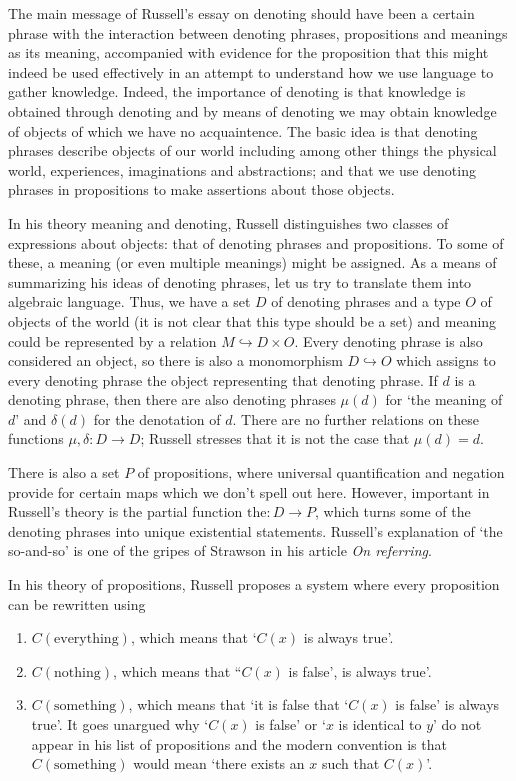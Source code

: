 \documentclass{article}
\begin{document}
\maketitle

The main message of Russell's essay on denoting should have been a certain
phrase with the interaction between denoting phrases, propositions and meanings
as its meaning, accompanied with evidence for the proposition that this might
indeed be used effectively in an attempt to understand how we use language to 
gather knowledge. Indeed, the importance of denoting is that knowledge
is obtained through denoting and by means of denoting we may obtain knowledge
of objects of which we have no acquaintence. The basic idea is that denoting
phrases describe objects of our world including among other things the physical 
world, experiences, imaginations and abstractions; and that we use denoting 
phrases in propositions to make assertions about those objects.

In his theory meaning and denoting, Russell distinguishes two classes of
expressions about objects: that of denoting phrases and
propositions. To some of these, a meaning (or even multiple meanings) might be
assigned. As a means of summarizing his ideas of denoting phrases, let us try
to translate them into algebraic language. Thus, we have a set $D$ of denoting
phrases and a type $O$ of objects of the world (it is not clear that this type
should be a set) and meaning could be represented by a relation 
$M\hookrightarrow D\times O$. Every denoting phrase is also considered an
object, so there is also a monomorphism $D \hookrightarrow O$ which assigns to
every denoting phrase the object representing that denoting phrase. If $d$ is
a denoting phrase, then there are also denoting phrases $\mu(d)$ for `the meaning
of $d$' and $\delta(d)$ for the denotation of $d$. There are no further relations
on these functions $\mu,\delta:D\to D$; Russell stresses that it is not the case
that $\mu(d)=d$.

There is also a set $P$ of propositions, where universal quantification and negation
provide for certain maps which we don't spell out here. However, important in
Russell's theory is the partial function $\text{the}:D\to P$, which turns some
of the denoting phrases into unique existential statements. Russell's explanation
of `the so-and-so' is one of the gripes of Strawson in his article \emph{On 
referring}.

In his theory of propositions, Russell proposes a system where every
proposition can be rewritten using
\begin{enumerate}
\item $C(\text{everything})$, which means that `$C(x)$ is always true'.
\item $C(\text{nothing})$, which means that ``$C(x)$ is false', is always true'.
\item $C(\text{something})$, which means that `it is false that `$C(x)$ is
false' is always true'. It goes unargued why `$C(x)$ is false' or `$x$ is
identical to $y$' do not appear in his list of propositions and the modern
convention is that $C(\text{something})$ would mean `there exists an $x$ such
that $C(x)$'. 
\end{enumerate}
\end{document}
